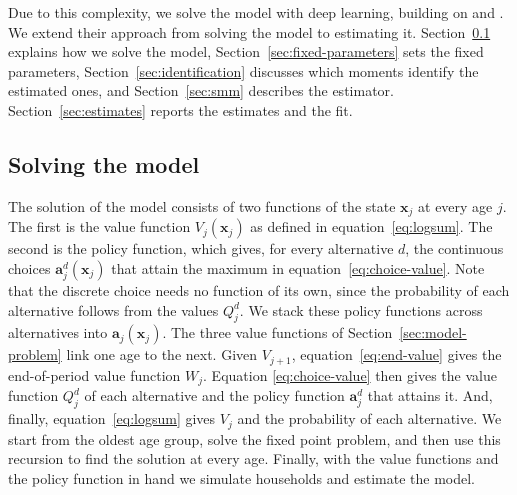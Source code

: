 Due to this complexity, we solve the model with deep learning, building on \citet{druedahl2026deep}
and \citet{druedahl2026nonconvex}. We extend their approach from solving the model to estimating it. Section~\ref{sec:solution} explains how we
solve the model, Section~\ref{sec:fixed-parameters} sets the fixed
parameters, Section~\ref{sec:identification} discusses which moments
identify the estimated ones, and Section~\ref{sec:smm} describes the
estimator. Section~\ref{sec:estimates} reports the estimates and the fit.

\subsection{Solving the model}\label{sec:solution}




The solution of the model consists of two functions of the state $\mathbf x_j$ at every
age $j$. The first is the value function $V_j(\mathbf x_j)$ as defined in
equation~\eqref{eq:logsum}. The second is the policy function, which gives, for every
alternative $d$, the continuous choices $\mathbf a_j^d(\mathbf x_j)$ that
attain the maximum in equation~\eqref{eq:choice-value}. Note that  the discrete choice needs no
function of its own, since the probability of each alternative follows
from the values $Q_j^d$. We stack these policy functions
across alternatives into $\mathbf a_j(\mathbf x_j)$. The three value functions of
Section~\ref{sec:model-problem} link one age to the next. Given $V_{j+1}$,
equation~\eqref{eq:end-value} gives the end-of-period value function $W_j$.
Equation \eqref{eq:choice-value} then gives the value function $Q_j^d$ of each
alternative and the policy function $\mathbf a_j^d$ that attains it. And, finally,
equation~\eqref{eq:logsum} gives $V_j$ and the probability of each
alternative. We start from the oldest age group, solve the fixed point problem, and then use this recursion to find the solution at every age. Finally, with the
value functions and the policy function in hand we simulate households and estimate the model.

